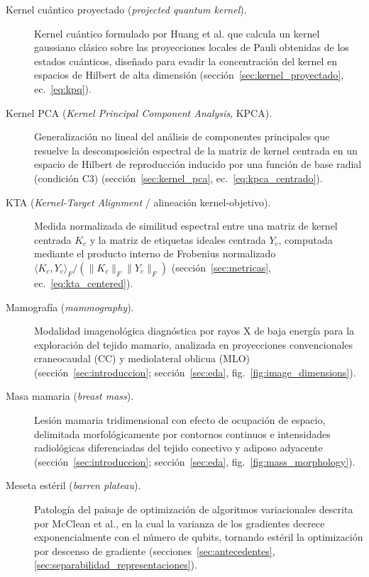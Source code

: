 \begin{description}
  \item[Kernel cuántico proyectado (\textit{projected quantum kernel}).] Kernel cuántico formulado por Huang et al. que calcula un kernel gaussiano clásico sobre las proyecciones locales de Pauli obtenidas de los estados cuánticos, diseñado para evadir la concentración del kernel en espacios de Hilbert de alta dimensión (sección~\ref{sec:kernel_proyectado}, ec.~\ref{eq:kpq}).

  \item[Kernel PCA (\textit{Kernel Principal Component Analysis}, KPCA).] Generalización no lineal del análisis de componentes principales que resuelve la descomposición espectral de la matriz de kernel centrada en un espacio de Hilbert de reproducción inducido por una función de base radial (condición C3) (sección~\ref{sec:kernel_pca}, ec.~\ref{eq:kpca_centrado}).

  \item[KTA (\textit{Kernel-Target Alignment} / alineación kernel-objetivo).] Medida normalizada de similitud espectral entre una matriz de kernel centrada $K_c$ y la matriz de etiquetas ideales centrada $Y_c$, computada mediante el producto interno de Frobenius normalizado $\langle K_c, Y_c \rangle_F / (\|K_c\|_F \|Y_c\|_F)$ (sección~\ref{sec:metricas}, ec.~\ref{eq:kta_centered}).

  \item[Mamografía (\textit{mammography}).] Modalidad imagenológica diagnóstica por rayos X de baja energía para la exploración del tejido mamario, analizada en proyecciones convencionales craneocaudal (CC) y mediolateral oblicua (MLO) (sección~\ref{sec:introduccion}; sección~\ref{sec:eda}, fig.~\ref{fig:image_dimensions}).

  \item[Masa mamaria (\textit{breast mass}).] Lesión mamaria tridimensional con efecto de ocupación de espacio, delimitada morfológicamente por contornos continuos e intensidades radiológicas diferenciadas del tejido conectivo y adiposo adyacente (sección~\ref{sec:introduccion}; sección~\ref{sec:eda}, fig.~\ref{fig:mass_morphology}).

  \item[Meseta estéril (\textit{barren plateau}).] Patología del paisaje de optimización de algoritmos variacionales descrita por McClean et al., en la cual la varianza de los gradientes decrece exponencialmente con el número de qubits, tornando estéril la optimización por descenso de gradiente (secciones~\ref{sec:antecedentes}, \ref{sec:separabilidad_representaciones}).


\end{description}
